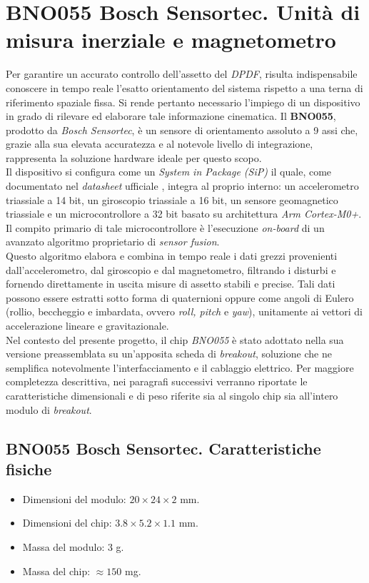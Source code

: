 \documentclass[11pt]{report}
\begin{document}
	\section{BNO055 Bosch Sensortec. Unità di misura inerziale e magnetometro}
	Per garantire un accurato controllo dell'assetto del \textit{DPDF}, risulta indispensabile conoscere in tempo reale l'esatto orientamento del sistema rispetto a una terna di riferimento spaziale fissa. Si rende pertanto necessario l'impiego di un dispositivo in grado di rilevare ed elaborare tale informazione cinematica. Il \textbf{BNO055}, prodotto da \textit{Bosch Sensortec}, è un sensore di orientamento assoluto a 9 assi che, grazie alla sua elevata accuratezza e al notevole livello di integrazione, rappresenta la soluzione hardware ideale per questo scopo.\\
	Il dispositivo si configura come un \textit{System in Package (SiP)} il quale, come documentato nel \textit{datasheet} ufficiale \cite{bno055_ds}, integra al proprio interno: un accelerometro triassiale a 14 bit, un giroscopio triassiale a 16 bit, un sensore geomagnetico triassiale e un microcontrollore a 32 bit basato su architettura \textit{Arm Cortex-M0+}. Il compito primario di tale microcontrollore è l'esecuzione \textit{on-board} di un avanzato algoritmo proprietario di \textit{sensor fusion}.\\
	Questo algoritmo elabora e combina in tempo reale i dati grezzi provenienti dall'accelerometro, dal giroscopio e dal magnetometro, filtrando i disturbi e fornendo direttamente in uscita misure di assetto stabili e precise. Tali dati possono essere estratti sotto forma di quaternioni oppure come angoli di Eulero (rollio, beccheggio e imbardata, ovvero \textit{roll, pitch} e \textit{yaw}), unitamente ai vettori di accelerazione lineare e gravitazionale.\\
	Nel contesto del presente progetto, il chip \textit{BNO055} è stato adottato nella sua versione preassemblata su un'apposita scheda di \textit{breakout}, soluzione che ne semplifica notevolmente l'interfacciamento e il cablaggio elettrico. Per maggiore completezza descrittiva, nei paragrafi successivi verranno riportate le caratteristiche dimensionali e di peso riferite sia al singolo chip sia all'intero modulo di \textit{breakout}.
	
	\subsection{BNO055 Bosch Sensortec. Caratteristiche fisiche}
	\begin{itemize}
		\item Dimensioni del modulo: $20\times 24\times 2$ mm.
		\item Dimensioni del chip: $3.8\times 5.2\times 1.1$ mm.
		\item Massa del modulo: 3 g.
		\item Massa del chip: $\approx 150$ mg.
	\end{itemize}
	
\end{document}
